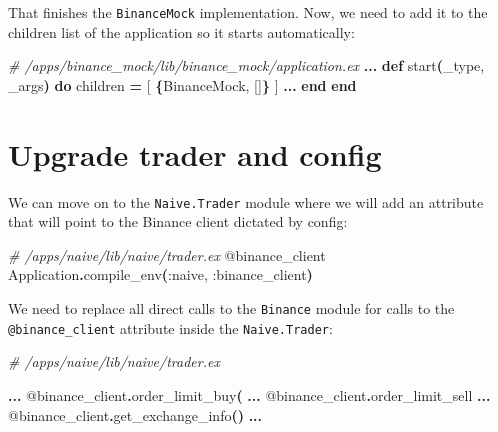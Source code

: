 \documentclass[
  oneside]{book}
\newenvironment{Shaded}{\begin{snugshade}}{\end{snugshade}}
\newcommand{\CommentTok}[1]{\textcolor[rgb]{0.56,0.35,0.01}{\textit{#1}}}
\newcommand{\ConstantTok}[1]{\textcolor[rgb]{0.56,0.35,0.01}{#1}}
\newcommand{\FunctionTok}[1]{\textcolor[rgb]{0.13,0.29,0.53}{\textbf{#1}}}
\newcommand{\KeywordTok}[1]{\textcolor[rgb]{0.13,0.29,0.53}{\textbf{#1}}}
\newcommand{\NormalTok}[1]{#1}
\newcommand{\OperatorTok}[1]{\textcolor[rgb]{0.81,0.36,0.00}{\textbf{#1}}}
\newcommand{\OtherTok}[1]{\textcolor[rgb]{0.56,0.35,0.01}{#1}}
\newcommand{\VariableTok}[1]{\textcolor[rgb]{0.00,0.00,0.00}{#1}}
\begin{document}
That finishes the \texttt{BinanceMock} implementation. Now, we need to add it to
the children list of the application so it starts automatically:

\begin{Shaded}
\begin{Highlighting}[]
\CommentTok{\# /apps/binance\_mock/lib/binance\_mock/application.ex}
\OperatorTok{...}
  \KeywordTok{def}\NormalTok{ start}\FunctionTok{(}\NormalTok{\_type, \_args}\FunctionTok{)} \KeywordTok{do}
\NormalTok{    children }\OperatorTok{=} \OtherTok{[}
      \FunctionTok{\{}\ConstantTok{BinanceMock}\NormalTok{, }\OtherTok{[]}\FunctionTok{\}}
    \OtherTok{]}
    \OperatorTok{...}
  \KeywordTok{end}
\KeywordTok{end}
\end{Highlighting}
\end{Shaded}

\section{Upgrade trader and config}\label{upgrade-trader-and-config}

We can move on to the \texttt{Naive.Trader} module where we will add an attribute that will point to the Binance client dictated by config:

\begin{Shaded}
\begin{Highlighting}[]
  \CommentTok{\# /apps/naive/lib/naive/trader.ex}
  \OtherTok{@binance\_client} \ConstantTok{Application}\OperatorTok{.}\NormalTok{compile\_env}\FunctionTok{(}\VariableTok{:naive}\NormalTok{, }\VariableTok{:binance\_client}\FunctionTok{)}
\end{Highlighting}
\end{Shaded}

We need to replace all direct calls to the \texttt{Binance} module for calls to the \texttt{@binance\_client} attribute inside the \texttt{Naive.Trader}:

\begin{Shaded}
\begin{Highlighting}[]
\CommentTok{\# /apps/naive/lib/naive/trader.ex}

\OperatorTok{...}
  \OtherTok{@binance\_client}\OperatorTok{.}\NormalTok{order\_limit\_buy}\FunctionTok{(}
\OperatorTok{...}
  \OtherTok{@binance\_client}\OperatorTok{.}\NormalTok{order\_limit\_sell}
\OperatorTok{...}
  \OtherTok{@binance\_client}\OperatorTok{.}\NormalTok{get\_exchange\_info}\FunctionTok{()}
\OperatorTok{...}
\end{Highlighting}
\end{Shaded}
\end{document}
